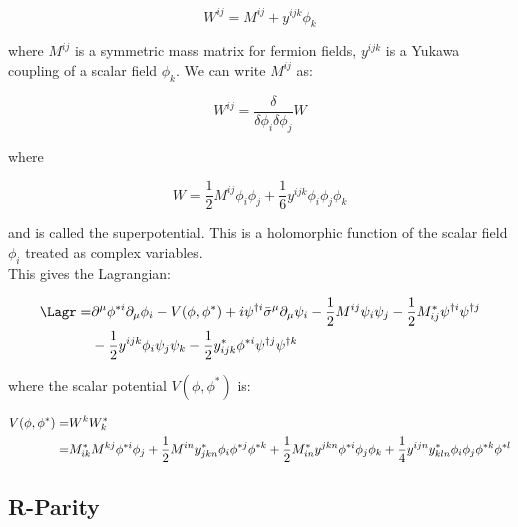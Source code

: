 \begin{equation}
	W^{ij} = M^{ij} + y^{ijk}\phi_{k}
\end{equation}

where $M^{ij}$ is a symmetric mass matrix for fermion fields, $y^{ijk}$ is a Yukawa coupling of a scalar field $\phi_{k}$.  We can write $M^{ij}$ as:

\begin{equation}
	W^{ij} = \frac{\delta}{\delta\phi_{i}\delta\phi_{j}}W
\end{equation}

where

\begin{equation}
	W = \frac{1}{2}M^{ij}\phi_{i}\phi_{j} + \frac{1}{6}y^{ijk}\phi_{i}\phi_{j}\phi_{k}
\end{equation}

and is called the superpotential.  This is a holomorphic function of the scalar field $\phi_{i}$ treated as complex variables.  \\

This gives the Lagrangian: 

\begin{equation}
\begin{split}
\Lagr =& \partial^\mu \phi^{*i} \partial_\mu \phi_i - V(\phi,\phi^*)
+ i \psi^{\dagger i} \bar{\sigma}^\mu \partial_\mu \psi_i
- \frac{1}{2} M^{ij} \psi_i\psi_j - \frac{1}{2} M_{ij}^{*} \psi^{\dagger i}\psi^{\dagger j} \\
&- \frac{1}{2} y^{ijk} \phi_i \psi_j \psi_k - \frac{1}{2} y_{ijk}^{*} \phi^{*i}
\psi^{\dagger j} \psi^{\dagger k}
\label{eq:lagrchiral}
\end{split}
\end{equation}

where the scalar potential $V(\phi,\phi^*)$ is:

\begin{align}
	V(\phi,\phi^*) =& W^k W_k^*
	\nonumber
	\\ 
	=&M^*_{ik} M^{kj} \phi^{*i} \phi_{j}
	+{1\over 2} M^{in} y_{jkn}^* \phi_i \phi^{*j} \phi^{*k}
	+{1\over 2} M_{in}^{*} y^{jkn} \phi^{*i} \phi_j \phi_k
	+{1\over 4} y^{ijn} y_{kln}^{*} \phi_i \phi_j \phi^{*k} \phi^{*l}
	\label{eq:ordpot}
\end{align}

\subsection{R-Parity}

